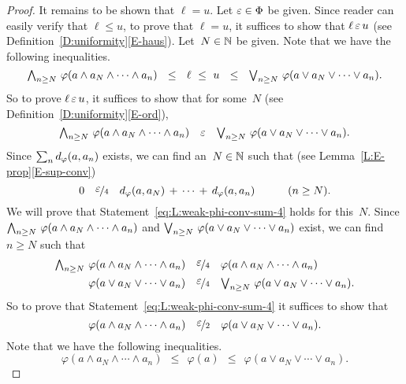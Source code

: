 \documentclass[main.tex]{subfiles}
\begin{document}
\begin{proof}
\vspace{.3em}
\noindent It remains to be shown that $\ell = u$.
Let $\varepsilon \in \Phi$ be given.
Since reader can easily verify that $\ell \leq u$,
to prove that $\ell = u$,
it suffices to show that $\ell \,\varepsilon\, u$
(see Definition~\ref{D:uniformity}\ref{E-haus}).
Let~$N\in\mathbb{N}$ be given. Note that we have the following inequalities.
\begin{equation*}
\bw_{n\geq N}\ \varphi(a\wedge a_N\wedge \dotsb \wedge a_n)
\ \ \leq\ \ 
\ell \ \leq\ u
\ \ \leq\ \ 
\bv_{n\geq N}\ \varphi(a\vee a_N\vee \dotsb \vee a_n).
\end{equation*}
So to prove $\ell \,\varepsilon\, u$,
it suffices to show that for some~$N$
(see Definition~\ref{D:uniformity}\ref{E-ord}),
\begin{equation}
\label{eq:L:weak-phi-conv-sum-4}
\textstyle{\bigwedge}_{n\geq N}\ \varphi(a\wedge a_N\wedge \dotsb \wedge a_n)
\quad\varepsilon\quad
\textstyle{\bigvee}_{n\geq N}\ \varphi(a\vee a_N\vee \dotsb \vee a_n).
\end{equation}
Since $\sum_n d_{\smash{\varphi}}(a,a_n)$ exists,
we can find an~$N\in\mathbb{N}$ such that
(see Lemma~\ref{L:E-prop}\ref{E-sup-conv})
\begin{equation}
\label{eq:L:weak-phi-conv-sum-4b}
0\quad \smash{\nicefrac{\textstyle{\varepsilon}}{4}} \quad d_{\smash{\varphi}}(a,a_N) \,+\, \dotsb \,+\, d_{\smash{\varphi}}(a,a_n)
\qquad\quad(n\geq N).
\end{equation}
We will prove that Statement~\eqref{eq:L:weak-phi-conv-sum-4}
holds for this~$N$.
Since $\textstyle{\bigwedge}_{n\geq N}\ \varphi(a\wedge a_N\wedge \dotsb \wedge a_n)$
and 
$\textstyle{\bigvee}_{n\geq N}\ \varphi(a\vee a_N\vee \dotsb \vee a_n)$
exist,
we can find $n\geq N$ such that
\begin{alignat*}{3}
\textstyle{\bigwedge}_{n\geq N}\ \varphi(a\wedge a_N\wedge \dotsb \wedge a_n)
\quad&\smash{\nicefrac{\textstyle{\varepsilon}}{4}} \quad
\varphi(a\wedge a_N\wedge \dotsb \wedge a_n)\\
\varphi(a\vee a_N\vee \dotsb \vee a_n)
\quad&\smash{\nicefrac{\textstyle{\varepsilon}}{4}} \quad
\textstyle{\bigvee}_{n\geq N}\ \varphi(a\vee a_N\vee \dotsb \vee a_n).
\end{alignat*}
So to prove that Statement~\eqref{eq:L:weak-phi-conv-sum-4}
it suffices to show that
\begin{equation}
\label{eq:L:weak-phi-conv-sum-5}
\varphi(a\wedge a_N\wedge \dotsb \wedge a_n)
\quad\smash{\nicefrac{\textstyle{\varepsilon}}{2}}\quad
\varphi(a\vee a_N\vee \dotsb \vee a_n).
\end{equation}
Note that we have the following inequalities.
\begin{equation*}
\varphi(a\wedge a_N\wedge \dotsb \wedge a_n)
\ \ \leq\ \ \varphi(a)\ \ \leq\ \ 
\varphi(a\vee a_N\vee \dotsb \vee a_n).
\end{equation*}

\end{proof}
\end{document}
